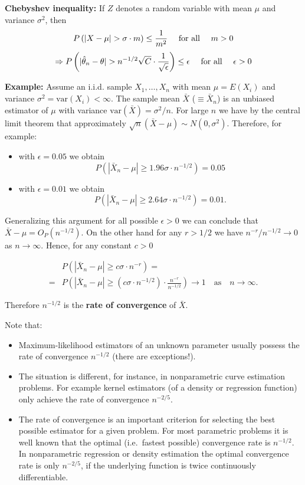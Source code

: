 \documentclass[
]{book}
\providecommand{\tightlist}{%
  \setlength{\itemsep}{0pt}\setlength{\parskip}{0pt}}
\begin{document}
\hfill\break

\textbf{Chebyshev inequality:} If \(Z\) denotes a random variable with mean \(\mu\) and variance \(\sigma^2\), then
\[P\left(|X-\mu|> \sigma \cdot m\right)\le \frac{1}{m^2}\quad\hbox{ for all }\quad m>0\]
\[\Rightarrow
P\left(|\hat\theta_n-\theta|> n^{-1/2}\sqrt{C} \cdot
\frac{1}{\sqrt{\epsilon}}\right)\leq \epsilon \quad\hbox{ for all }\quad\epsilon>0\]

\hfill\break

\textbf{Example:} Assume an i.i.d. sample \(X_1,\dots,X_n\) with mean \(\mu=E(X_i)\) and variance \(\sigma^2=\textrm{var}(X_i)<\infty\). The sample mean \(\bar X\) (\(\equiv \bar X_n\)) is an unbiased estimator of \(\mu\) with variance \(\textrm{var}(\bar X)=\sigma^2/n\).
For large \(n\) we have by the central limit theorem that approximately \(\sqrt{n}(\bar X-\mu)\sim N(0,\sigma^2)\). Therefore, for example:

\begin{itemize}
\tightlist
\item
  with \(\epsilon=0.05\) we obtain
  \[P\left(|\bar X_n-\mu|\ge 1.96\sigma\cdot n^{-1/2}\right)=0.05\]
\item
  with \(\epsilon=0.01\) we obtain
  \[P\left(|\bar X_n-\mu|\ge 2.64\sigma\cdot n^{-1/2}\right)=0.01.\]
\end{itemize}

Generalizing this argument for all possible \(\epsilon>0\) we can conclude that
\(\bar X-\mu=O_P(n^{-1/2})\). On the other hand for any \(r>1/2\) we have \(n^{-r}/n^{-1/2}\rightarrow 0\) as \(n\rightarrow \infty\). Hence, for any constant \(c>0\)

\begin{align*}
 &P\left(|\bar X_n-\mu|\geq c\sigma\cdot n^{-r}\right)=\\
=&P\left(|\bar X_n-\mu|\ge (c\sigma\cdot n^{-1/2})\cdot\frac{n^{-r}}{n^{-1/2}}\right)\rightarrow 1 \quad\text{as}\quad n\rightarrow \infty.
\end{align*}

Therefore \(n^{-1/2}\) is the \textbf{rate of convergence} of \(\bar X\).

\hfill\break

Note that:

\begin{itemize}
\tightlist
\item
  Maximum-likelihood estimators of an unknown parameter usually possess the rate of convergence \(n^{-1/2}\) (there are exceptions!).
\item
  The situation is different, for instance, in nonparametric curve estimation problems. For example kernel estimators (of a density or regression function) only achieve the rate of convergence \(n^{-2/5}\).
\item
  The rate of convergence is an important criterion for selecting the best possible estimator for a given problem. For most parametric problems it is well known that the optimal (i.e.~fastest possible) convergence rate is \(n^{-1/2}\). In nonparametric regression or density estimation the optimal convergence rate is only \(n^{-2/5}\), if the underlying function is twice continuously differentiable.
\end{itemize}
\end{document}
